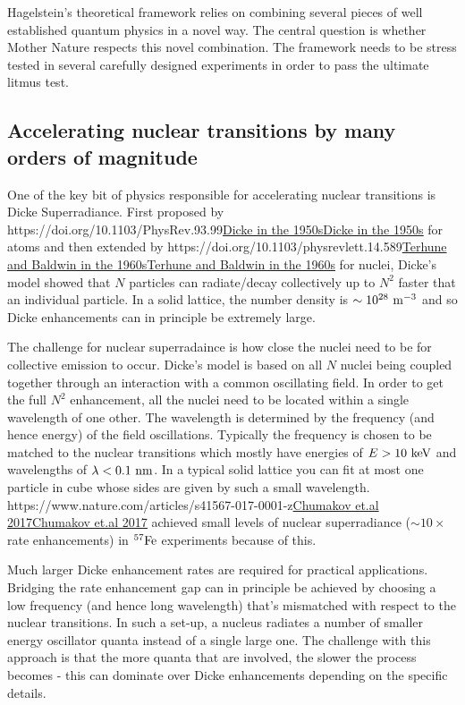 \documentclass[
]{article}
\let\oldhref\href
\renewcommand{\href}[2]{\ifx#1\urlprefix\oldhref{#1}{#2}\else\uline{\oldhref{#1}{#2}}\fi}
\renewcommand{\[}{\begin{equation}}
\renewcommand{\]}{\end{equation}}
\begin{document}
Hagelstein's theoretical framework relies on combining several pieces of
well established quantum physics in a novel way. The central question is
whether Mother Nature respects this novel combination. The framework
needs to be stress tested in several carefully designed experiments in
order to pass the ultimate litmus test.

\subsection{Accelerating nuclear transitions by many orders of
magnitude}\label{accelerating-nuclear-transitions-by-many-orders-of-magnitude}

One of the key bit of physics responsible for accelerating nuclear
transitions is Dicke Superradiance. First proposed by
\href{https://doi.org/10.1103/PhysRev.93.99}{Dicke in the 1950s} for
atoms and then extended by
\href{https://doi.org/10.1103/physrevlett.14.589}{Terhune and Baldwin in
the 1960s} for nuclei, Dicke's model showed that \(N\) particles can
radiate/decay collectively up to \(N^2\) faster that an individual
particle. In a solid lattice, the number density is
\(\sim 10^{28} \ \rm m^{-3}\) and so Dicke enhancements can in principle
be extremely large.

The challenge for nuclear superradaince is how close the nuclei need to
be for collective emission to occur. Dicke's model is based on all \(N\)
nuclei being coupled together through an interaction with a common
oscillating field. In order to get the full \(N^2\) enhancement, all the
nuclei need to be located within a single wavelength of one other. The
wavelength is determined by the frequency (and hence energy) of the
field oscillations. Typically the frequency is chosen to be matched to
the nuclear transitions which mostly have energies of
\(E > 10 \ \rm keV\) and wavelengths of \(\lambda < 0.1 \ \rm nm\). In a
typical solid lattice you can fit at most one particle in cube whose
sides are given by such a small wavelength.
\href{https://www.nature.com/articles/s41567-017-0001-z}{Chumakov et.al
2017} achieved small levels of nuclear superradiance (\(\sim 10 \times\)
rate enhancements) in \(\rm ^{57}Fe\) experiments because of this.

Much larger Dicke enhancement rates are required for practical
applications. Bridging the rate enhancement gap can in principle be
achieved by choosing a low frequency (and hence long wavelength) that's
mismatched with respect to the nuclear transitions. In such a set-up, a
nucleus radiates a number of smaller energy oscillator quanta instead of
a single large one. The challenge with this approach is that the more
quanta that are involved, the slower the process becomes - this can
dominate over Dicke enhancements depending on the specific details.
\end{document}
